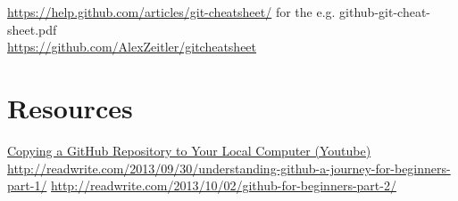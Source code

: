 \documentclass[11pt,a4paper]{article}
\begin{document}
\noindent
\href{https://help.github.com/articles/git-cheatsheet}{https://help.github.com/articles/git-cheatsheet/}
for the e.g. github-git-cheat-sheet.pdf \\

\noindent
\href{https://github.com/AlexZeitler/gitcheatsheet}{https://github.com/AlexZeitler/gitcheatsheet}


\section*{Resources}

\href{https://www.youtube.com/watch?v=O72FWNeO-xY}{Copying a GitHub Repository to Your Local Computer (Youtube)}\\
\href{http://readwrite.com/2013/09/30/understanding-github-a-journey-for-beginners-part-1/}{http://readwrite.com/2013/09/30/understanding-github-a-journey-for-beginners-part-1/}
\href{http://readwrite.com/2013/10/02/github-for-beginners-part-2/}{http://readwrite.com/2013/10/02/github-for-beginners-part-2/}
\end{document}
